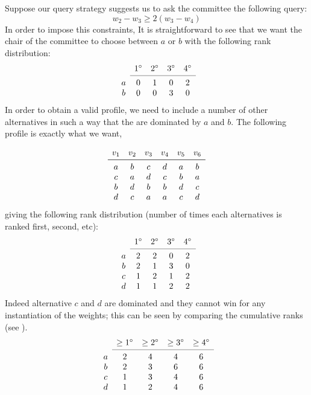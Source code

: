 \begin{example}
Suppose our query strategy suggests us to ask the committee the following query:
\[ w_{2} - w_{3} \geq 2(w_{3} - w_{4}) \]
In order to impose this constraints,
It is straightforward to see that we want the  chair of the committee to choose between $a$ or $b$ with the following rank distribution:
\[
\begin{array}{ccccc}
& 1^\circ
& 2^\circ
& 3^\circ
& 4^\circ \\
\cmidrule{2-5}
a & 0& 1& 0& 2 \\
b& 0& 0& 3& 0 \\
\end{array}
\]
In order to obtain a valid profile, we need to include a number of other alternatives in such a way that the are dominated by $a$ and $b$.
The following profile is exactly what we want,

\[
\begin{array}{cccccc}
v_1& v_2& v_3 & v_4& v_5& v_6 \\
\midrule 
a& b& c & d& a& b \\
c& a& d& c& b& a \\
b& d& b& b& d& c \\
d& c& a& a& c& d \\
\end{array}
\]
giving the following rank distribution (number of times each alternatives is ranked first, second, etc): 
\[
\begin{array}{ccccc}
& 1^\circ& 2^\circ& 3^\circ& 4^\circ \\
\cmidrule{2-5}
a & 2& 2& 0& 2 \\
b& 2& 1& 3& 0 \\
c& 1& 2& 1& 2 \\
d& 1& 1& 2& 2 \\
\end{array}
\]
Indeed alternative $c$ and $d$ are dominated and they cannot win for any instantiation of the weights; this can be seen by comparing the cumulative ranks (see  \citep{Stein1994}).
\[
\begin{array}{ccccc}
& \geq 1^\circ
& \geq 2^\circ
& \geq 3^\circ
& \geq 4^\circ \\
\cmidrule{2-5}
a & 2 & 4& 4& 6 \\
b & 2 & 3& 6& 6 \\
c& 1& 3& 4& 6 \\
d& 1& 2& 4& 6 \\
\end{array}
\]
\end{example}



